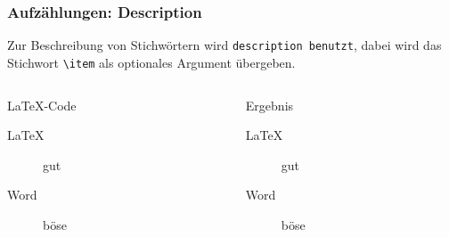 \begin{frame}[fragile]
    \frametitle{Aufzählungen: Description}
    Zur Beschreibung von Stichwörtern wird \texttt{description benutzt}, dabei wird das
    Stichwort \verb-\item- als optionales Argument übergeben.
    \begin{columns}[t]
        \begin{column}{0.47\textwidth}
            \begin{block}{\LaTeX-Code}
                \begin{lstverbatim}
                \begin{description}
                    \item[\LaTeX] gut
                    \item[Word] böse
                \end{description}
                \end{lstverbatim}
            \end{block}
        \end{column}
        \begin{column}{0.47\textwidth}
            \begin{block}{Ergebnis}
                \begin{description}
                    \item[\LaTeX] gut
                    \item[Word] böse
                \end{description}
            \end{block}
        \end{column}
    \end{columns}
\end{frame}
